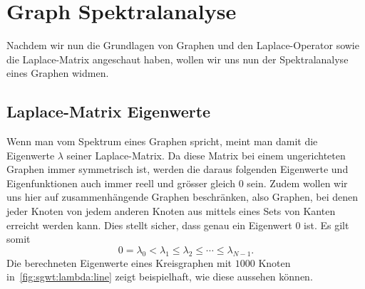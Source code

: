
\section{Graph Spektralanalyse\label{sec:sgwt:spectralanalysis}}

Nachdem wir nun die Grundlagen von Graphen und den Laplace-Operator sowie die 
Laplace-Matrix angeschaut haben, wollen wir uns nun der Spektralanalyse eines 
Graphen widmen.

\subsection{Laplace-Matrix Eigenwerte}

Wenn man vom Spektrum eines Graphen spricht, meint man damit die Eigenwerte 
$\lambda$ seiner Laplace-Matrix. Da diese Matrix bei einem ungerichteten 
Graphen immer symmetrisch ist, werden die daraus folgenden Eigenwerte und 
Eigenfunktionen auch immer reell und gr\"osser gleich $0$ sein. Zudem wollen wir 
uns hier auf zusammenh\"angende Graphen beschr\"anken, also Graphen, bei denen jeder 
Knoten von jedem anderen Knoten aus mittels eines Sets von Kanten erreicht 
werden kann. Dies stellt sicher, dass genau ein Eigenwert $0$ 
ist. Es gilt somit
\begin{equation}
0 = \lambda_0 < \lambda_1 \leq \lambda_2 \leq \cdots \leq \lambda_{N-1}.
\label{eq:sgwt:lambda:series}
\end{equation}
Die berechneten Eigenwerte eines Kreisgraphen mit $1000$ Knoten 
in~\cref{fig:sgwt:lambda:line} zeigt beispielhaft, wie diese aussehen k\"onnen.
